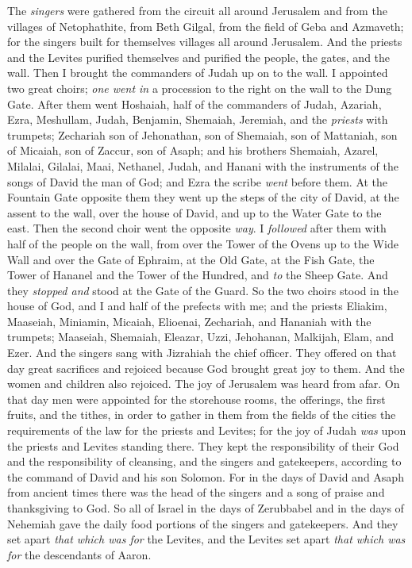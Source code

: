 \begin{biblechapter}
\verse The \textit{singers} were gathered from the circuit all around Jerusalem and from the villages of Netophathite,
\verse from Beth Gilgal, from the field of Geba and Azmaveth; for the singers built for themselves villages all around Jerusalem.
\verse And the priests and the Levites purified themselves and purified the people, the gates, and the wall.
\verse Then I brought the commanders of Judah up on to the wall. I appointed two great choirs; \textit{one went in} a procession to the right on the wall to the Dung Gate.
\verse After them went Hoshaiah, half of the commanders of Judah,
\verse Azariah, Ezra, Meshullam,
\verse Judah, Benjamin, Shemaiah, Jeremiah,
\verse and the \textit{priests} with trumpets; Zechariah son of Jehonathan, son of Shemaiah, son of Mattaniah, son of Micaiah, son of Zaccur, son of Asaph;
\verse and his brothers Shemaiah, Azarel, Milalai, Gilalai, Maai, Nethanel, Judah, and Hanani with the instruments of the songs of David the man of God; and Ezra the scribe \textit{went} before them.
\verse At the Fountain Gate opposite them they went up the steps of the city of David, at the assent to the wall, over the house of David, and up to the Water Gate to the east.
\verse Then the second choir went the opposite \textit{way}. I \textit{followed} after them with half of the people on the wall, from over the Tower of the Ovens up to the Wide Wall
\verse and over the Gate of Ephraim, at the Old Gate, at the Fish Gate, the Tower of Hananel and the Tower of the Hundred, and \textit{to} the Sheep Gate. And they \textit{stopped and} stood at the Gate of the Guard.
\verse So the two choirs stood in the house of God, and I and half of the prefects with me;
\verse and the priests Eliakim, Maaseiah, Miniamin, Micaiah, Elioenai, Zechariah, and Hananiah with the trumpets;
\verse Maaseiah, Shemaiah, Eleazar, Uzzi, Jehohanan, Malkijah, Elam, and Ezer. And the singers sang with Jizrahiah the chief officer.
\verse They offered on that day great sacrifices and rejoiced because God brought great joy to them. And the women and children also rejoiced. The joy of Jerusalem was heard from afar.
 On that day men were appointed for the storehouse rooms, the offerings, the first fruits, and the tithes, in order to gather in them from the fields of the cities the requirements of the law for the priests and Levites; for the joy of Judah \textit{was} upon the priests and Levites standing there.
\verse They kept the responsibility of their God and the responsibility of cleansing, and the singers and gatekeepers, according to the command of David and his son Solomon.
\verse For in the days of David and Asaph from ancient times there was the head of the singers and a song of praise and thanksgiving to God.
\verse So all of Israel in the days of Zerubbabel and in the days of Nehemiah gave the daily food portions of the singers and gatekeepers. And they set apart \textit{that which was for} the Levites, and the Levites set apart \textit{that which was for} the descendants of Aaron.
\end{biblechapter}

